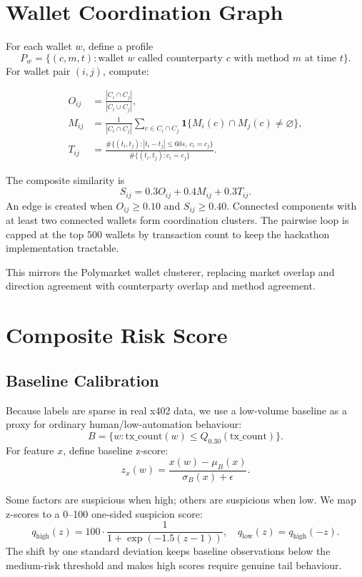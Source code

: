\documentclass[11pt]{article}
\begin{document}
\section{Wallet Coordination Graph}

For each wallet \(w\), define a profile
\[
  P_w = \{(c,m,t): \text{wallet } w \text{ called counterparty } c
          \text{ with method } m \text{ at time } t\}.
\]
For wallet pair \((i,j)\), compute:

\begin{align*}
O_{ij} &= \frac{|C_i\cap C_j|}{|C_i\cup C_j|},\\
M_{ij} &= \frac{1}{|C_i\cap C_j|}\sum_{c\in C_i\cap C_j}
          \mathbf{1}\{M_i(c)\cap M_j(c)\neq \varnothing\},\\
T_{ij} &= \frac{\#\{(t_i,t_j): |t_i-t_j|\leq 60s,\ c_i=c_j\}}
              {\#\{(t_i,t_j): c_i=c_j\}}.
\end{align*}

The composite similarity is
\[
  S_{ij}=0.3O_{ij}+0.4M_{ij}+0.3T_{ij}.
\]
An edge is created when \(O_{ij}\geq 0.10\) and \(S_{ij}\geq 0.40\).  Connected
components with at least two connected wallets form coordination clusters.
The pairwise loop is capped at the top 500 wallets by transaction count to keep
the hackathon implementation tractable.

This mirrors the Polymarket wallet clusterer, replacing market overlap and
direction agreement with counterparty overlap and method agreement.

\section{Composite Risk Score}

\subsection{Baseline Calibration}

Because labels are sparse in real x402 data, we use a low-volume baseline as a
proxy for ordinary human/low-automation behaviour:
\[
  B=\{w: \mathrm{tx\_count}(w)\leq Q_{0.30}(\mathrm{tx\_count})\}.
\]
For feature \(x\), define baseline z-score:
\[
  z_x(w)=\frac{x(w)-\mu_B(x)}{\sigma_B(x)+\epsilon}.
\]

Some factors are suspicious when high; others are suspicious when low.  We map
z-scores to a 0--100 one-sided suspicion score:
\[
  q_{\mathrm{high}}(z)=
  100\cdot \frac{1}{1+\exp(-1.5(z-1))},
  \quad
  q_{\mathrm{low}}(z)=q_{\mathrm{high}}(-z).
\]
The shift by one standard deviation keeps baseline observations below the
medium-risk threshold and makes high scores require genuine tail behaviour.
\end{document}
